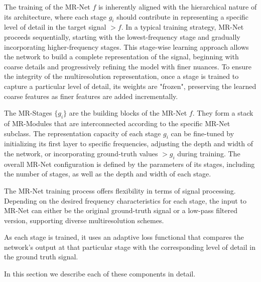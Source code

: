 The training of the MR-Net $f$ is inherently aligned with the hierarchical nature of its architecture, where each stage $g_i$ should contribute in representing a specific level of detail in the target signal $\gt{f}$. In a typical training strategy, MR-Net proceeds sequentially, starting with the lowest-frequency stage and gradually incorporating higher-frequency stages. This stage-wise learning approach allows the network to build a complete representation of the signal, beginning with coarse details and progressively refining the model with finer nuances. To ensure the integrity of the multiresolution representation, once a stage is trained to capture a particular level of detail, its weights are "frozen", preserving the learned coarse features as finer features are added incrementally.

The MR-Stages $\{g_i\}$ are the building blocks of the MR-Net $f$. They form a stack of MR-Modules that are interconnected according to the specific MR-Net subclass. The representation capacity of each stage $g_i$ can be fine-tuned by initializing its first layer to specific frequencies, adjusting the depth and width of the network, or incorporating ground-truth values $\gt{g}_i$ during training. The overall MR-Net configuration is defined by the parameters of its stages, including the number of stages, as well as the depth and width of each stage.


The MR-Net training process offers flexibility in terms of signal processing. Depending on the desired frequency characteristics for each stage, the input to MR-Net can either 
be the original ground-truth signal or a low-pass filtered version, supporting diverse multiresolution schemes.

As each stage is trained, it uses an adaptive loss functional that compares the network's output at that particular stage with the corresponding level of detail in the ground truth signal.

In this section we describe each of these components in detail.



